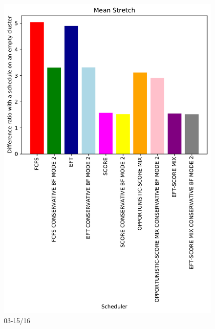 \documentclass[a4paper]{article}
\begin{document}
\begin{figure}\includegraphics[width=0.9\linewidth]{MBSS/plot/Results_FCFS_Score_Backfill_2022-03-15->2022-03-16_V10000_Mean_Stretch_450_128_32_256_4_1024.pdf}\caption{03-15/16}\end{figure}
\end{document}
